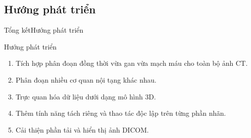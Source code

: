 \documentclass[
	10pt,                %
	aspectratio=169,     %
]{beamer}
\begin{document}
\subsection{Hướng phát triển}
	\begin{frame}{Tổng kết}{Hướng phát triển}
		\begin{block}{Hướng phát triển}
			\begin{enumerate}
				\item Tích hợp phân đoạn đồng thời vừa gan vừa mạch máu cho toàn bộ ảnh CT.
				\item Phân đoạn nhiều cơ quan nội tạng khác nhau.
				\item Trực quan hóa dữ liệu dưới dạng mô hình 3D.
				\item Thêm tính năng tách riêng và thao tác độc lập trên từng phần nhãn.
				\item Cải thiện phần tải và hiển thị ảnh DICOM.
			\end{enumerate}
		\end{block}
	\end{frame}
	
\end{document}
